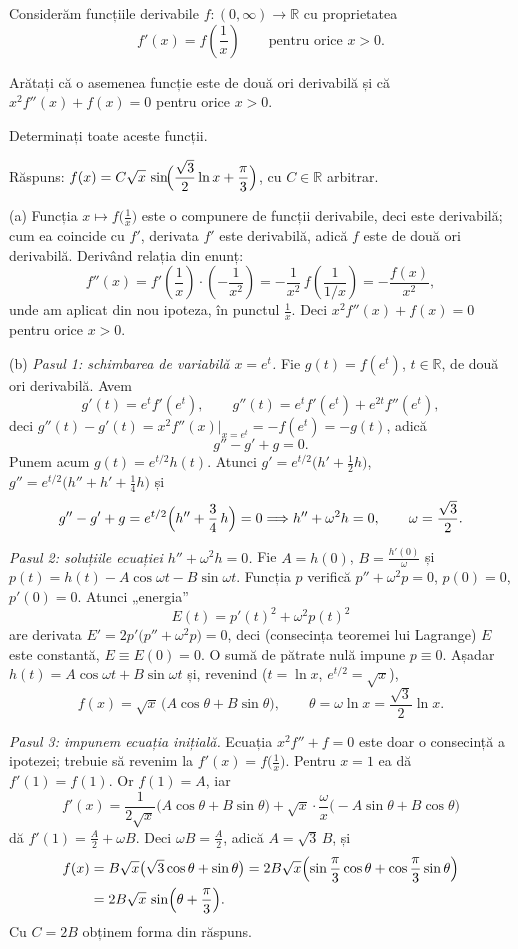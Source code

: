 Considerăm funcțiile derivabile $f:(0,\infty)\to\mathbb{R}$ cu proprietatea
\[ f'(x)=f\!\left(\frac1x\right)\qquad\text{pentru orice }x>0 . \]
\begin{parti}
  \item Arătați că o asemenea funcție este de două ori derivabilă și că $x^{2}f''(x)+f(x)=0$ pentru orice $x>0$.
  \item Determinați toate aceste funcții.
\end{parti}
\sol Răspuns: $\displaystyle f(x)=C\sqrt{x}\,\sin\!\Bigl(\frac{\sqrt3}{2}\ln x+\frac{\pi}{3}\Bigr)$, cu $C\in\mathbb{R}$ arbitrar.

(a) Funcția $x\mapsto f\bigl(\frac1x\bigr)$ este o compunere de funcții derivabile, deci este derivabilă; cum ea coincide cu $f'$, derivata $f'$ este derivabilă, adică $f$ este de două ori derivabilă. Derivând relația din enunț:
\[ f''(x)=f'\!\left(\frac1x\right)\cdot\left(-\frac1{x^2}\right)=-\frac1{x^2}\,f\!\left(\frac{1}{1/x}\right)=-\frac{f(x)}{x^2}, \]
unde am aplicat din nou ipoteza, în punctul $\frac1x$. Deci $x^2f''(x)+f(x)=0$ pentru orice $x>0$.

(b) \emph{Pasul 1: schimbarea de variabilă $x=e^{t}$.} Fie $g(t)=f(e^{t})$, $t\in\mathbb{R}$, de două ori derivabilă. Avem
\[ g'(t)=e^{t}f'(e^{t}),\qquad g''(t)=e^{t}f'(e^{t})+e^{2t}f''(e^{t}), \]
deci $g''(t)-g'(t)=x^2f''(x)\big|_{x=e^t}=-f(e^t)=-g(t)$, adică
\[ g''-g'+g=0 . \]
Punem acum $g(t)=e^{t/2}h(t)$. Atunci $g'=e^{t/2}\bigl(h'+\tfrac12h\bigr)$, $g''=e^{t/2}\bigl(h''+h'+\tfrac14h\bigr)$ și
\[ g''-g'+g=e^{t/2}\Bigl(h''+\frac34\,h\Bigr)=0 \Longrightarrow h''+\omega^2h=0,\qquad \omega=\frac{\sqrt3}{2} . \]

\emph{Pasul 2: soluțiile ecuației $h''+\omega^2h=0$.} Fie $A=h(0)$, $B=\frac{h'(0)}{\omega}$ și $p(t)=h(t)-A\cos\omega t-B\sin\omega t$. Funcția $p$ verifică $p''+\omega^2p=0$, $p(0)=0$, $p'(0)=0$. Atunci „energia''
\[ E(t)=p'(t)^2+\omega^2p(t)^2 \]
are derivata $E'=2p'\bigl(p''+\omega^2p\bigr)=0$, deci (consecința teoremei lui Lagrange) $E$ este constantă, $E\equiv E(0)=0$. O sumă de pătrate nulă impune $p\equiv0$. Așadar $h(t)=A\cos\omega t+B\sin\omega t$ și, revenind ($t=\ln x$, $e^{t/2}=\sqrt x$),
\[ f(x)=\sqrt{x}\,\bigl(A\cos\theta+B\sin\theta\bigr),\qquad \theta=\omega\ln x=\frac{\sqrt3}{2}\ln x . \]

\emph{Pasul 3: impunem ecuația inițială.} Ecuația $x^2f''+f=0$ este doar o consecință a ipotezei; trebuie să revenim la $f'(x)=f\bigl(\frac1x\bigr)$. Pentru $x=1$ ea dă $f'(1)=f(1)$. Or $f(1)=A$, iar
\[ f'(x)=\frac{1}{2\sqrt x}\bigl(A\cos\theta+B\sin\theta\bigr)+\sqrt x\cdot\frac{\omega}{x}\bigl(-A\sin\theta+B\cos\theta\bigr) \]
dă $f'(1)=\frac A2+\omega B$. Deci $\omega B=\frac A2$, adică $A=\sqrt3\,B$, și
\[ \begin{aligned} f(x)&=B\sqrt x\bigl(\sqrt3\cos\theta+\sin\theta\bigr)=2B\sqrt x\Bigl(\sin\frac\pi3\cos\theta+\cos\frac\pi3\sin\theta\Bigr)\\ &=2B\sqrt x\,\sin\Bigl(\theta+\frac\pi3\Bigr). \end{aligned} \]
Cu $C=2B$ obținem forma din răspuns.

